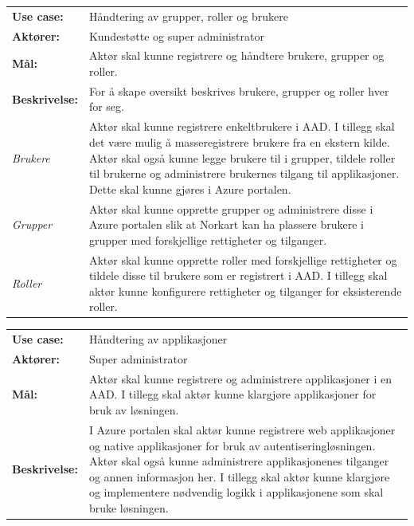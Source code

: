 \begin{framed}
    \begin{tabular}{l p{9cm}}
        \textbf{Use case:} & Håndtering av grupper, roller og brukere \\
        \textbf{Aktører:} & Kundestøtte og super administrator 
        \bigskip \\
        \textbf{Mål:} & Aktør skal kunne registrere og håndtere brukere, grupper og roller.
        \bigskip \\
        \textbf{Beskrivelse:} & For å skape oversikt beskrives brukere, grupper og roller hver for seg.
        \bigskip \\
        \textit{Brukere} & Aktør skal kunne registrere enkeltbrukere i AAD. I tillegg skal det være mulig å masseregistrere brukere fra en ekstern kilde. Aktør skal også kunne legge brukere til i grupper, tildele roller til brukerne og administrere brukernes tilgang til applikasjoner. Dette skal kunne gjøres i Azure portalen.
        \bigskip \\
        \textit{Grupper} & Aktør skal kunne opprette grupper og administrere disse i Azure portalen slik at Norkart kan ha plassere brukere i grupper med forskjellige rettigheter og tilganger. 
        \bigskip \\
        \textit{Roller} & Aktør skal kunne opprette roller med forskjellige rettigheter og tildele disse til brukere som er registrert i AAD. I tillegg skal aktør kunne konfigurere rettigheter og tilganger for eksisterende roller.
    \end{tabular}
\end{framed}

\begin{framed}
    \begin{tabular}{l p{9cm}}
        \textbf{Use case:} & Håndtering av applikasjoner \\
        \textbf{Aktører:} & Super administrator
        \bigskip \\
        \textbf{Mål:} & Aktør skal kunne registrere og administrere applikasjoner i en AAD. I tillegg skal aktør kunne klargjøre applikasjoner for bruk av løsningen.
        \bigskip \\
        \textbf{Beskrivelse:} & I Azure portalen skal aktør kunne registrere web applikasjoner og native applikasjoner for bruk av autentiseringløsningen. Aktør skal også kunne administrere applikasjonenes tilganger og annen informasjon her. I tillegg skal aktør kunne klargjøre og implementere nødvendig logikk i applikasjonene som skal bruke løsningen.
    \end{tabular}
\end{framed}

